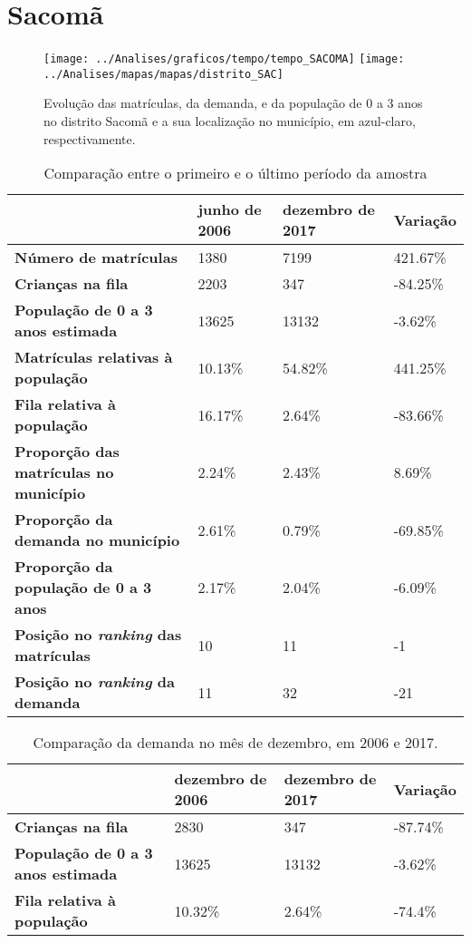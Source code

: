 \section{Sacomã}
\begin{figure}[H]
\centering
\texttt{[image: ../Analises/graficos/tempo/tempo\_SACOMA]}
\texttt{[image: ../Analises/mapas/mapas/distrito\_SAC]}
\caption{Evolução das matrículas, da demanda, e da população de 0 a 3 anos no distrito Sacomã e a sua localização no município, em azul-claro, respectivamente.}
\end{figure}
\begin{table}[H]
\begin{tabular}{l|l|l|l}
\textbf{}                                      & \textbf{junho de 2006}       & \textbf{dezembro de 2017}    & \textbf{Variação} \\ \hline
\textbf{Número de matrículas}                  & 1380 & 7199 & 421.67\% \\ \hline
\textbf{Crianças na fila}                      & 2203 & 347 & -84.25\% \\ \hline
\textbf{População de 0 a 3 anos estimada}      & 13625 & 13132 & -3.62\% \\ \hline
\textbf{Matrículas relativas à população}      & 10.13\% & 54.82\% & 441.25\% \\ \hline
\textbf{Fila relativa à população}             & 16.17\% & 2.64\% & -83.66\% \\ \hline
\textbf{Proporção das matrículas no município} & 2.24\% & 2.43\% & 8.69\% \\ \hline
\textbf{Proporção da demanda no município}     & 2.61\% & 0.79\% & -69.85\% \\ \hline
\textbf{Proporção da população de 0 a 3 anos}  & 2.17\% & 2.04\% & -6.09\% \\ \hline
\textbf{Posição no \textit{ranking} das matrículas}     & 10 & 11 & -1 \\ \hline
\textbf{Posição no \textit{ranking} da demanda}         & 11 & 32 & -21 \\ 
\end{tabular}
\caption{Comparação entre o primeiro e o último período da amostra}
\end{table}
\begin{table}[H]
\begin{tabular}{l|l|l|l}
\textbf{}                                 & \textbf{dezembro de 2006} & \textbf{dezembro de 2017} & \textbf{Variação} \\ \hline
\textbf{Crianças na fila}                      & 2830 & 347 & -87.74\% \\ \hline
\textbf{População de 0 a 3 anos estimada}      & 13625 & 13132 & -3.62\% \\ \hline
\textbf{Fila relativa à população}             & 10.32\% & 2.64\% & -74.4\% \\
\end{tabular}
\caption{Comparação da demanda no mês de dezembro, em 2006 e 2017.}
\end{table}
